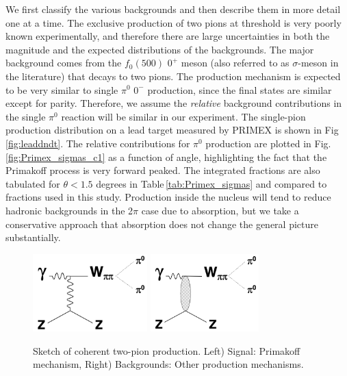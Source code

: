 We first classify the various backgrounds and then describe them in more detail one at a time. The exclusive production of two pions at threshold is very poorly known experimentally, and therefore there are large uncertainties in both the magnitude and the expected distributions of the backgrounds.  The major background comes from the $f_0(500)$ $0^{+}$ meson (also referred to as $\sigma$-meson in the literature) that decays to two pions. The production mechanism is expected to be very similar to single $\pi^0$ $0^{-}$ production, since the final states are similar except for parity. Therefore, we assume the {\em relative} background contributions in the single $\pi^0$ reaction will be similar in our experiment. The single-pion production distribution on a lead target measured by PRIMEX \cite{Larin:2018} is shown in Fig\,\ref{fig:leaddndt}. The relative contributions for $\pi^0$ production are plotted in Fig.\,\ref{fig:Primex_sigmas_c1} as a function of angle, highlighting the fact that the Primakoff process is very forward peaked. The integrated fractions are also tabulated for $\theta < 1.5$ degrees in Table\,\ref{tab:Primex_sigmas} and compared to fractions used in this study.
Production inside the nucleus will tend to reduce hadronic backgrounds in the 2$\pi$ case due to absorption, but we take a conservative approach that absorption does not change the general picture substantially. 

 \begin{figure}[tbh]
\begin{center}
\includegraphics[height=3cm,clip=true]{figures/Diagram_Primakoff.png} \hspace{1cm}
\includegraphics[height=3cm,clip=true]{figures/Diagram_hadronic.png}
\caption{Sketch of coherent two-pion production. Left) Signal: Primakoff mechanism, Right) Backgrounds: Other production mechanisms.
\label{fig:Diagram}}
\end{center}
\end{figure}

